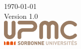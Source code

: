 \begin{titlepage}
\vfill



{\large \today}\\[3mm] %
{\large Version 1.0}\\[1.5cm] 


\includegraphics[height=13mm]{../images/logo.png} %



\end{titlepage}
